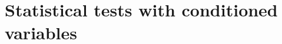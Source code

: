 \section{Statistical tests with conditioned variables}\label{sec:statistical_tests_with_conditioned_variables}

